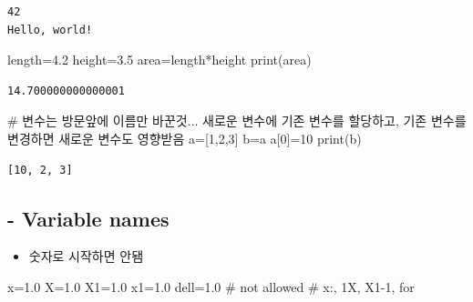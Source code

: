 \documentclass[
  a4paper,
  DIV=11,
  numbers=noendperiod]{scrreprt}
\newenvironment{Shaded}{\begin{snugshade}}{\end{snugshade}}
\newcommand{\BuiltInTok}[1]{\textcolor[rgb]{0.00,0.23,0.31}{#1}}
\newcommand{\CommentTok}[1]{\textcolor[rgb]{0.37,0.37,0.37}{#1}}
\newcommand{\DecValTok}[1]{\textcolor[rgb]{0.68,0.00,0.00}{#1}}
\newcommand{\FloatTok}[1]{\textcolor[rgb]{0.68,0.00,0.00}{#1}}
\newcommand{\NormalTok}[1]{\textcolor[rgb]{0.00,0.23,0.31}{#1}}
\newcommand{\OperatorTok}[1]{\textcolor[rgb]{0.37,0.37,0.37}{#1}}
\providecommand{\tightlist}{%
  \setlength{\itemsep}{0pt}\setlength{\parskip}{0pt}}\usepackage{longtable,booktabs,array}
\begin{document}
\begin{verbatim}
42
Hello, world!
\end{verbatim}

\begin{Shaded}
\begin{Highlighting}[]
\NormalTok{length}\OperatorTok{=}\FloatTok{4.2}
\NormalTok{height}\OperatorTok{=}\FloatTok{3.5}
\NormalTok{area}\OperatorTok{=}\NormalTok{length}\OperatorTok{*}\NormalTok{height}
\BuiltInTok{print}\NormalTok{(area)}
\end{Highlighting}
\end{Shaded}

\begin{verbatim}
14.700000000000001
\end{verbatim}

\begin{Shaded}
\begin{Highlighting}[]
\CommentTok{\# 변수는 방문앞에 이름만 바꾼것... 새로운 변수에 기존 변수를 할당하고, 기존 변수를 변경하면 새로운 변수도 영향받음}
\NormalTok{a}\OperatorTok{=}\NormalTok{[}\DecValTok{1}\NormalTok{,}\DecValTok{2}\NormalTok{,}\DecValTok{3}\NormalTok{]}
\NormalTok{b}\OperatorTok{=}\NormalTok{a}
\NormalTok{a[}\DecValTok{0}\NormalTok{]}\OperatorTok{=}\DecValTok{10}
\BuiltInTok{print}\NormalTok{(b)}
\end{Highlighting}
\end{Shaded}

\begin{verbatim}
[10, 2, 3]
\end{verbatim}

\subsection{- Variable names}\label{variable-names}

\begin{itemize}
\tightlist
\item
  숫자로 시작하면 안됌
\end{itemize}

\begin{Shaded}
\begin{Highlighting}[]
\NormalTok{x}\OperatorTok{=}\FloatTok{1.0}
\NormalTok{X}\OperatorTok{=}\FloatTok{1.0}
\NormalTok{X1}\OperatorTok{=}\FloatTok{1.0}
\NormalTok{x1}\OperatorTok{=}\FloatTok{1.0}
\NormalTok{dell}\OperatorTok{=}\FloatTok{1.0}
\CommentTok{\# not allowed}
\CommentTok{\# x:, 1X, X1{-}1, for}
\end{Highlighting}
\end{Shaded}
\end{document}
